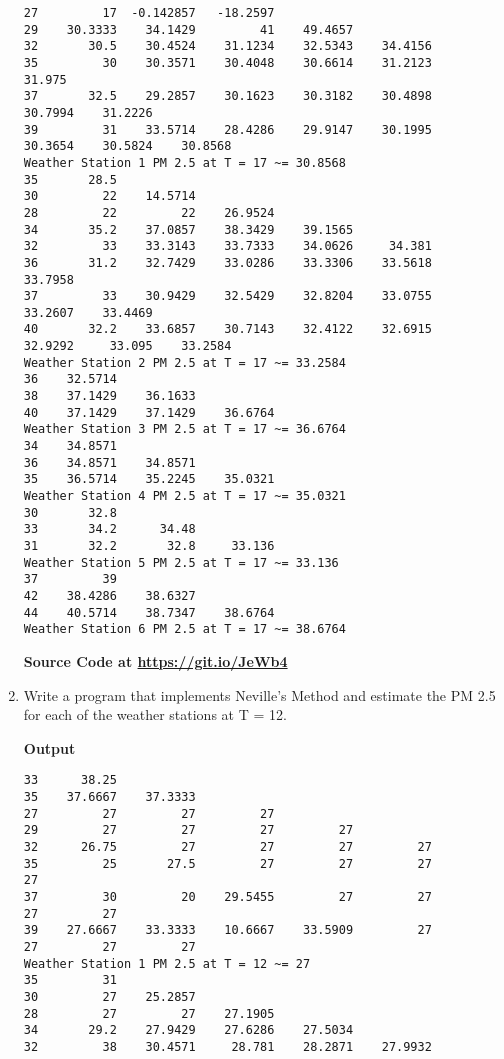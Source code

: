 \documentclass{exam}
\begin{document}
\begin{enumerate}
\begin{verbatim}
27         17  -0.142857   -18.2597
29    30.3333    34.1429         41    49.4657
32       30.5    30.4524    31.1234    32.5343    34.4156
35         30    30.3571    30.4048    30.6614    31.2123     31.975
37       32.5    29.2857    30.1623    30.3182    30.4898    30.7994    31.2226
39         31    33.5714    28.4286    29.9147    30.1995    30.3654    30.5824    30.8568
Weather Station 1 PM 2.5 at T = 17 ~= 30.8568
35       28.5
30         22    14.5714
28         22         22    26.9524
34       35.2    37.0857    38.3429    39.1565
32         33    33.3143    33.7333    34.0626     34.381
36       31.2    32.7429    33.0286    33.3306    33.5618    33.7958
37         33    30.9429    32.5429    32.8204    33.0755    33.2607    33.4469
40       32.2    33.6857    30.7143    32.4122    32.6915    32.9292     33.095    33.2584
Weather Station 2 PM 2.5 at T = 17 ~= 33.2584
36    32.5714
38    37.1429    36.1633
40    37.1429    37.1429    36.6764
Weather Station 3 PM 2.5 at T = 17 ~= 36.6764
34    34.8571
36    34.8571    34.8571
35    36.5714    35.2245    35.0321
Weather Station 4 PM 2.5 at T = 17 ~= 35.0321
30       32.8
33       34.2      34.48
31       32.2       32.8     33.136
Weather Station 5 PM 2.5 at T = 17 ~= 33.136
37         39
42    38.4286    38.6327
44    40.5714    38.7347    38.6764
Weather Station 6 PM 2.5 at T = 17 ~= 38.6764
    \end{verbatim}
    \begin{center}
        \textbf{Source Code at \url{https://git.io/JeWb4}}
    \end{center}
	    \item  Write a program that implements Neville's Method and estimate the PM 2.5 for each of the weather stations at T = 12.
    \begin{center}
        \textbf{Output}
    \end{center}
    \begin{verbatim}
33      38.25
35    37.6667    37.3333
27         27         27         27
29         27         27         27         27
32      26.75         27         27         27         27
35         25       27.5         27         27         27         27
37         30         20    29.5455         27         27         27         27
39    27.6667    33.3333    10.6667    33.5909         27         27         27         27
Weather Station 1 PM 2.5 at T = 12 ~= 27
35         31
30         27    25.2857
28         27         27    27.1905
34       29.2    27.9429    27.6286    27.5034
32         38    30.4571     28.781    28.2871    27.9932

\end{verbatim}
\end{enumerate}
\end{document}
